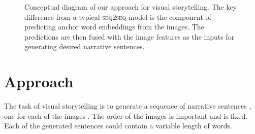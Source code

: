 \begin{figure}[t]
    \centering
    \caption{Conceptual diagram of our approach for visual storytelling. The key difference from a typical \textsc{seq2seq} model is the component of predicting anchor word embeddings from the images. The predictions are then fused with the image features as the inputs for generating desired narrative sentences.}
    \label{fig:overall}
\end{figure}

\begin{table}[t]
    \small
    \centering
    \caption{Adding ground-truth words as anchor words to a \textsc{seq2seq} model significantly improves its performance where only image features are used. The higher numerical value indicates better performance.}
    \vspace{-0.2in}
    \label{tab:gt_anchor}
\end{table}




\section{Approach}
\label{sApproach}

The task of visual storytelling is to generate a sequence of narrative sentences , one for each of the  images . The order of the images is important and is fixed. Each of the generated sentences  could contain a variable length of words.

